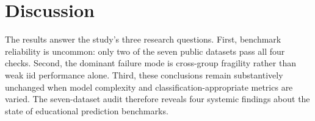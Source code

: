 \documentclass[10pt,letterpaper]{article}
\begin{document}
\begin{table}[!ht]
\centering
\caption{Classification-metric sensitivity check on the four datasets with binary or ordinal targets. Accuracy and AUC-ROC are reported for each classifier under iid 100-split resampling and group-aware holdout. $I_{\mathrm{acc}}$ is the accuracy-based instability ratio.}
\label{tab:classification_sensitivity}
%
\end{table}

\FloatBarrier
\clearpage
\section{Discussion}

The results answer the study's three research questions. First, benchmark reliability is uncommon: only two of the seven public datasets pass all four checks. Second, the dominant failure mode is cross-group fragility rather than weak iid performance alone. Third, these conclusions remain substantively unchanged when model complexity and classification-appropriate metrics are varied. The seven-dataset audit therefore reveals four systemic findings about the state of educational prediction benchmarks.
\end{document}
